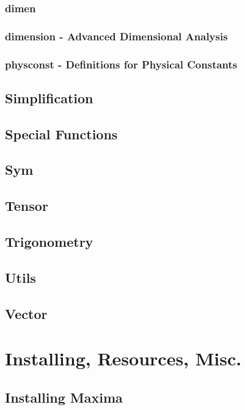 \documentclass[oneside,english]{book}
\begin{document}
   \section{dimen}
%   
   \pagebreak
   \section{dimension - Advanced Dimensional Analysis}
   
   \pagebreak
   \section{physconst - Definitions for Physical Constants}
%      
\chapter{Simplification}
\chapter{Special Functions}
\chapter{Sym}
\chapter{Tensor}
\chapter{Trigonometry}
\chapter{Utils}
\chapter{Vector}

\part{Installing, Resources, Misc.}  
\chapter{Installing Maxima}
  
  
\listoffigures


\printindex



\nocite{*}
\end{document}
